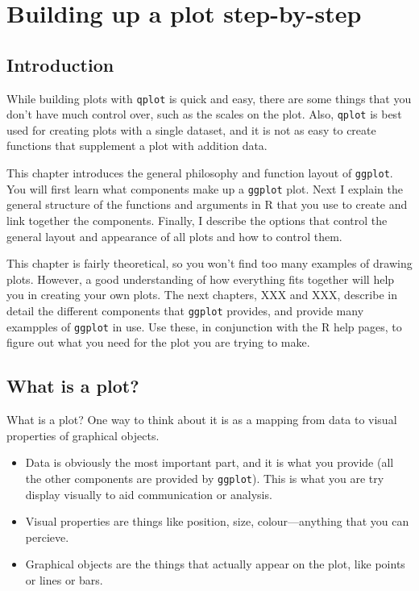 


\chapter{Building up a plot step-by-step}

\section{Introduction}\label{sec:introduction}

While building plots with {\tt qplot} is quick and easy, there are some things that you don't have much control over, such as the scales on the plot.  Also, {\tt qplot} is best used for creating plots with a single dataset, and it is not as easy to create functions that supplement a plot with addition data.  

This chapter introduces the general philosophy and function layout of {\tt ggplot}.  You will first learn what components make up a {\tt ggplot} plot.  Next I explain the general structure of the functions and arguments in R that you use to create and link together the components.  Finally, I describe the options that control the general layout and appearance of all plots and how to control them.

This chapter is fairly theoretical, so you won't find too many examples of drawing plots.  However, a good understanding of how everything fits together will help you in creating your own plots.   The next chapters, XXX and XXX, describe in detail the different components that {\tt ggplot} provides, and provide many exampples of {\tt ggplot} in use.  Use these, in conjunction with the R help pages, to figure out what you need for the plot you are trying to make.  

\section{What is a plot?}\label{sec:what_is_a_plot}

What is a plot?  One way to think about it is as a mapping from data to visual properties of graphical objects.

\begin{itemize}
	\item Data is obviously the most important part, and it is what you provide (all the other components are provided by {\tt ggplot}).  This is what you are try display visually to aid communication or analysis.
	
	\item Visual properties are things like position, size, colour---anything that you can percieve.

	\item Graphical objects are the things that actually appear on the plot, like points or lines or bars.  
\end{itemize}

